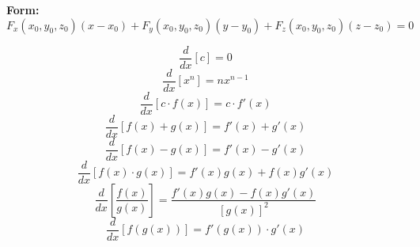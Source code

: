 \documentclass[2pt]{article}
\begin{document}
\begin{multicols}{2}
\begin{tcolorbox}[title=\textbf{Directional Derivative and Gradient Vector}, colframe=lightblue]
\end{tcolorbox}

\begin{tcolorbox}[title=\textbf{Tangent Planes and Surfaces}, colframe=lightblue]
    \textbf{Form:} 	
    \[ \scriptstyle F_x(x_0, y_0, z_0)(x - x_0) + F_y(x_0, y_0, z_0)(y - y_0) + F_z(x_0, y_0, z_0)(z - z_0) = 0  \]
\end{tcolorbox}

\begin{tcolorbox}[title=\textbf{Derivative Rules}, colframe=lightblue]
    \[ \frac{d}{dx} [c] = 0 \]
    \[ \frac{d}{dx} [x^n] = nx^{n-1} \]
    \[ \frac{d}{dx} [c \cdot f(x)] = c \cdot f'(x) \]
    \[ \frac{d}{dx} [f(x) + g(x)] = f'(x) + g'(x) \]
    \[ \frac{d}{dx} [f(x) - g(x)] = f'(x) - g'(x) \]
    \[ \frac{d}{dx} [f(x) \cdot g(x)] = f'(x) g(x) + f(x) g'(x) \]
    \[ \frac{d}{dx} \left[ \frac{f(x)}{g(x)} \right] = \frac{f'(x) g(x) - f(x) g'(x)}{[g(x)]^2} \]
    \[ \frac{d}{dx} [f(g(x))] = f'(g(x)) \cdot g'(x) \]
\end{tcolorbox}


\end{multicols}
\end{document}
